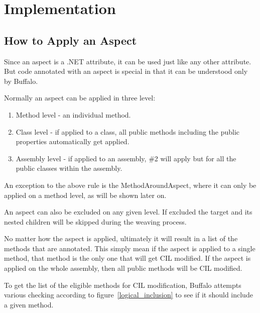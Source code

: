 \chapter{Implementation}

\section{How to Apply an Aspect}

Since an aspect is a .NET attribute, it can be used just like any other attribute. But code annotated with an aspect is special in that it can be understood only by Buffalo.

Normally an aspect can be applied in three level:

\begin{enumerate}
  \item Method level - an individual method.
  \item Class level - if applied to a class, all public methods including the public properties automatically get applied.
  \item Assembly level - if applied to an assembly, \#2 will apply but for all the public classes within the assembly.
\end{enumerate}

An exception to the above rule is the MethodAroundAspect, where it can only be applied on a method level, as will be shown later on.

An aspect can also be excluded on any given level. If excluded the target and its nested children will be skipped during the weaving process.

No matter how the aspect is applied, ultimately it will result in a list of the methods that are annotated. This simply mean if the aspect is applied to a single method, that method is the only one that will get CIL modified. If the aspect is applied on the whole assembly, then all public methods will be CIL modified.

To get the list of the eligible methods for CIL modification, Buffalo attempts various checking according to figure~\ref{logical_inclusion} to see if it should include a given method.

